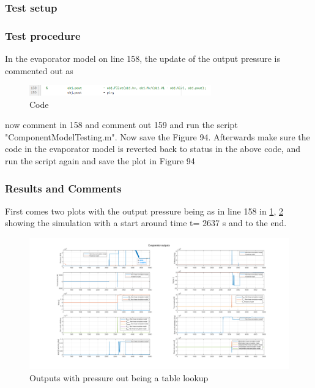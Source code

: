\subsubsection{Test setup}


\subsubsection{Test procedure}
In the evaporator model on line 158, the update of the output pressure is commented out as 

\begin{figure}[h!]
	\centering
	\includegraphics[width=0.7\textwidth]{Tests/Evapo_test1/pout_code.png}
	\caption{Code}
	\label{fig:evapotest1_code}
\end{figure}

now comment in 158 and comment out 159
and run the script "ComponentModelTesting.m". Now save the Figure 94. 
Afterwards make sure the code in the evaporator model is reverted back to status in the above code, and run the script again and save the plot in Figure 94 


\subsubsection{Results and Comments}
First comes two plots with the output pressure being as in line 158 in \cref{fig:evapotest1_code}, \cref{fig:evapotest_plot1} showing the simulation with a start around time t= 2637 s and to the end. 

\begin{figure}[h]
	\centering
	\includegraphics[width=2.1\textwidth]{Tests/Evapo_test1/plot_unstable.png}
	\caption{Outputs with pressure out being a table lookup}
	\label{fig:evapotest_plot1}
\end{figure}

